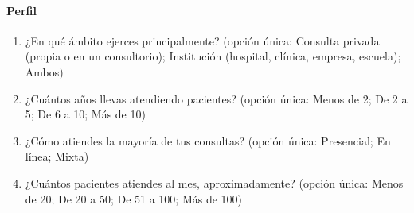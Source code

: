 \documentclass[12pt, a4paper]{article}
\begin{document}
\paragraph{Perfil}
\begin{enumerate}
  \item ¿En qué ámbito ejerces principalmente? (opción única: Consulta privada (propia o en un consultorio); Institución (hospital, clínica, empresa, escuela); Ambos)
  \item ¿Cuántos años llevas atendiendo pacientes? (opción única: Menos de 2; De 2 a 5; De 6 a 10; Más de 10)
  \item ¿Cómo atiendes la mayoría de tus consultas? (opción única: Presencial; En línea; Mixta)
  \item ¿Cuántos pacientes atiendes al mes, aproximadamente? (opción única: Menos de 20; De 20 a 50; De 51 a 100; Más de 100)
\end{enumerate}
 
\end{document}
